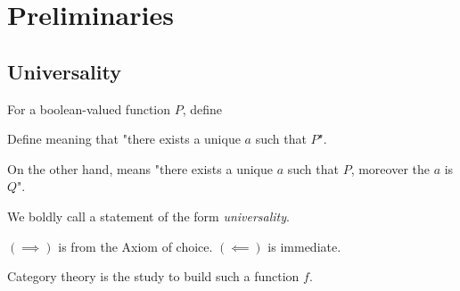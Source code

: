 \section{Preliminaries}



\subsection{Universality}

\begin{definition}
For a boolean-valued function $P$, define
\end{definition}
\begin{definition}
Define
meaning that "there exists a unique $a$ such that $P$".
\end{definition}
\begin{remark}
On the other hand,
means "there exists a unique $a$ such that $P$, moreover the $a$ is $Q$".
\end{remark}

\begin{definition}[Universality]
We boldly call a statement of the form
\emph{universality}.
\end{definition}

\begin{proposition}
\end{proposition}
\begin{strdproof}
$(\implies)$ is from the Axiom of choice. $(\impliedby)$ is immediate.
\end{strdproof}
\mynewline
Category theory is the study to build such a function $f$.

